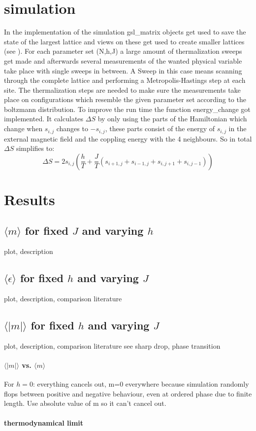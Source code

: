 \documentclass{scrartcl}
\begin{document}
\section{simulation}
In the implementation of the simulation gsl\_matrix objects get used to save the state of the largest lattice and views on these get used to create smaller lattices (see \cite{gsldoc_mat}). For each parameter set (N,h,J) a large amount of thermalization sweeps get made and afterwards several measurements of the wanted physical variable take place with single sweeps in between. A Sweep in this case means scanning through the complete lattice and performing a Metropolis-Hastings step at each site. The thermalization steps are needed to make sure the measurements take place on configurations which resemble the given parameter set according to the boltzmann distribution. To improve the run time the function energy\_change got implemented. It calculates $\Delta S$ by only using the parts of the Hamiltonian which change when $s_{i,j}$ changes to $-s_{i,j}$, these parts consist of the energy of $s_{i,j}$ in the external magnetic field and the coppling energy with the 4 neighbours.
So in total $\Delta S$ simplifies to:
\begin{equation}
	\Delta S=2 s_{i,j}\left(\dfrac{h}{T}+\dfrac{J}{T}(s_{i+1,j}+s_{i-1,j}+s_{i,j+1}+s_{i,j-1})\right)
\end{equation}


\section{Results}

\subsection{$\langle m\rangle$ for fixed $J$ and varying $h$}
plot, description

\subsection{$\langle \epsilon\rangle$ for fixed $h$ and varying $J$}
plot, description, comparison literature

\subsection{$\langle |m|\rangle$ for fixed $h$ and varying $J$}
plot, description, comparison literature
see sharp drop, phase transition
\paragraph{$\langle |m|\rangle$ vs. $\langle m\rangle$}
For $h=0$: everything cancels out, m=0 everywhere because simulation randomly flops between positive and negative behaviour, even at ordered phase due to finite length.
Use absolute value of m so it can't cancel out.

\paragraph{thermodynamical limit}



\newpage	
\listoffigures
\printbibliography
\end{document}
